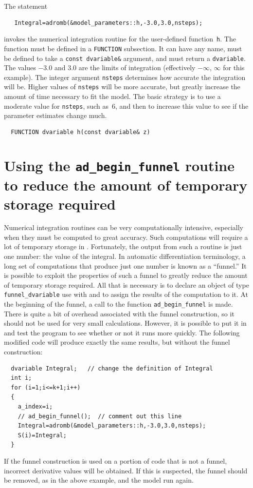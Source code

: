 \documentclass{admbmanual}
\begin{document}
The statement
\begin{lstlisting}
   Integral=adromb(&model_parameters::h,-3.0,3.0,nsteps);
\end{lstlisting}
invokes the numerical integration routine for the user-defined
function~\texttt{h}. The function must be defined in a \texttt{FUNCTION}
subsection. It can have any name, must be defined to take a
\texttt{const dvariable\&} argument, and must return a \texttt{dvariable}. The
values $-3.0$ and $3.0$ are the limits of integration (effectively $-\infty$,
$\infty$ for this example). The integer argument \texttt{nsteps} determines how
accurate the integration will be. Higher values of \texttt{nsteps} will be more
accurate, but greatly increase the amount of time necessary to fit the model.
The basic strategy is to use a moderate value for \texttt{nsteps}, such as~6,
and then to increase this value to see if the parameter estimates change much.
\begin{lstlisting}
  FUNCTION dvariable h(const dvariable& z)
\end{lstlisting}

\section{Using the \texttt{ad\_begin\_funnel} routine to reduce\br
  the amount of temporary storage required}

Numerical integration routines can be very computationally intensive, especially
when they must be computed to great accuracy. Such computations will require a
lot of temporary storage in \ADM. Fortunately, the output from such a routine is
just one number: the value of the integral. In automatic differentiation
terminology, a long set of computations that produce just one number is known as
a ``funnel.'' It is possible to exploit the properties of such a funnel to
greatly reduce the amount of temporary storage required. All that is necessary
is to declare an object of type \texttt{funnel\_dvariable}
%
{use with}
and to assign the results of the computation to it. At the beginning of the
funnel, a call to the function \texttt{ad\_begin\_funnel} is made. There is
quite a bit of overhead associated with the funnel construction, so it should
not be used for very small calculations. However, it is possible to put it in
and test the program to see whether or not it runs more quickly. The following
modified code will produce exactly the same results, but without the funnel
construction:
\begin{lstlisting}
  dvariable Integral;   // change the definition of Integral
  int i;
  for (i=1;i<=k+1;i++)
  {
    a_index=i;
    // ad_begin_funnel();  // comment out this line
    Integral=adromb(&model_parameters::h,-3.0,3.0,nsteps);
    S(i)=Integral;
  }
\end{lstlisting}
If the funnel construction is used on a portion of code that is not a funnel,
incorrect derivative values will be obtained. If this is suspected, the funnel
should be removed, as in the above example, and the model run again.
\end{document}

